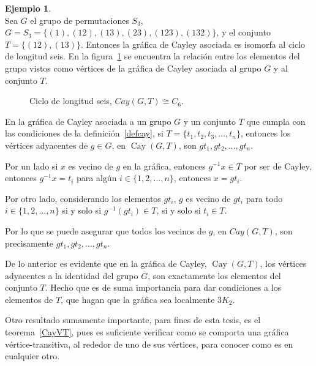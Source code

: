 \documentclass[12pt]{book}
\theoremstyle{definition}
\newtheorem{example}{Ejemplo}
\DeclareMathOperator{\Cay}{Cay}
\begin{document}
\begin{example}\textbf{}\\
  Sea $G$ el grupo de permutaciones $S_3$, $G=S_3=
  \{(1),(12),(13),(23),(123),(132)\}$, y el conjunto $T=\{(12),(13)\}$.
 Entonces la gráfica de Cayley asociada es isomorfa al ciclo de
 longitud seis. En la figura~\ref{C6} se encuentra la relación entre
 los elementos del grupo vistos como vértices de la gráfica de Cayley
 asociada al grupo $G$ y al conjunto $T$.
\end{example}


\begin{figure}[htb]
  \centering
  \caption{Ciclo de longitud seis, $Cay(G,T)\cong C_6$.} \label{C6}
\end{figure}


En la gráfica de Cayley asociada a un grupo $G$ y un conjunto $T$ que
cumpla con las condiciones de la definición~\ref{defcay}, si $T=\{t_1,t_2,t_3,..., t_n\}$, entonces los vértices adyacentes de $g\in G$, en
$\Cay(G,T)$, son $gt_1,gt_2,...,gt_n$. 

Por un lado si $x$ es vecino de $g$ en la gráfica, entonces $g^{-1}x\in T$ por ser de Cayley, entonces  $g^{-1}x=t_i$
para algún $i\in \{1,2,...,n\}$, entonces $x=gt_i$.

Por otro lado, considerando los elementos $gt_i$, $g$ es vecino
de $gt_i$ para todo $i\in \{1,2,...,n\}$ si y solo si $g^{-1}(gt_i)\in
T$, si y solo si $t_i \in T$.

Por lo que se puede asegurar que todos
los vecinos de $g$, en $Cay(G,T)$, son  precisamente $gt_1,gt_2,...,gt_n$. 

De lo anterior es evidente que en la gráfica de Cayley, $\Cay(G,T)$,
los vértices adyacentes a la identidad del grupo $G$, son exactamente
los elementos del conjunto $T$. Hecho que es de suma
importancia para dar condiciones a los elementos de $T$, que hagan que
la gráfica sea localmente $3K_2$.


Otro resultado sumamente importante, para fines de esta tesis, es el
teorema~\ref{CayVT}, pues es suficiente verificar como se comporta una gráfica
vértice-transitiva, al rededor de uno de sus vértices, para conocer como es en cualquier otro.
\end{document}

